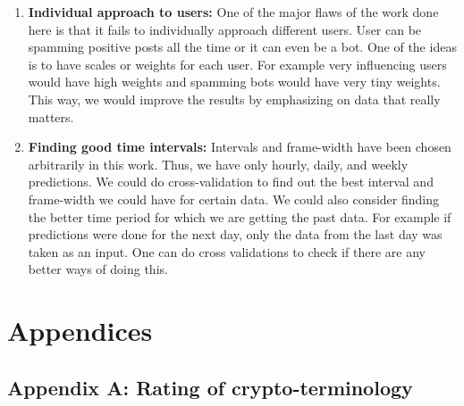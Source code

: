 \documentclass[a4paper,11pt,oneside]{article}
\begin{document}
\begin{enumerate}
	\item {\bf Individual approach to users:} One of the major flaws of the work done here is that it fails to individually approach different users. User can be spamming positive posts all the time or it can even be a bot. One of the ideas is to have scales or weights for each user. For example very influencing users would have high weights and spamming bots would have very tiny weights. This way, we would improve the results by emphasizing on data that really matters.
	
	\item {\bf Finding good time intervals: } Intervals and frame-width have been chosen arbitrarily in this work. Thus, we have only hourly, daily, and weekly predictions. We could do cross-validation to find out the best interval and frame-width we could have for certain data. We could also consider finding the better time period for which we are getting the past data. For example if predictions were done for the next day, only the data from the last day was taken as an input. One can do cross validations to check if there are any better ways of doing this. 
  \end{enumerate}
  
  \newpage
  
  
  
  \newpage
  \section{Appendices}

  \subsection{Appendix A: Rating of crypto-terminology}
  \label{ratings}
  
\end{document}

